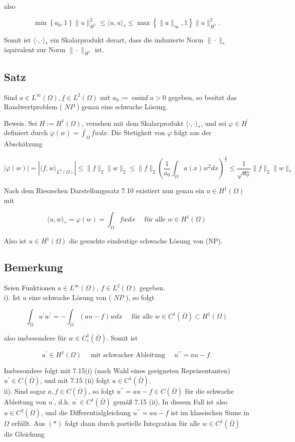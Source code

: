 \documentclass[10pt, letterpaper]{article}
\begin{document}
also

$$
\min \left\{a_{0}, 1\right\}\|u\|_{H^{1}}^{2} \leq\langle u, u\rangle_{*} \leq \max \left\{\|a\|_{\infty}, 1\right\}\|u\|_{H^{1}}^{2} .
$$

Somit ist $\langle\cdot, \cdot\rangle_{*}$ ein Skalarprodukt derart, dass die induzierte Norm $\|\cdot\|_{*}$ äquivalent zur Norm $\|\cdot\|_{H^{1}}$ ist.

\subsection*{Satz}
Sind $a \in L^{\infty}(\Omega), f \in L^{2}(\Omega)$ mit $a_{0}:=\operatorname{essinf} a>0$ gegeben, so besitzt das Randwertproblem ( $N P$ ) genau eine schwache Lösung.

Beweis. Sei $H:=H^{1}(\Omega)$, versehen mit dem Skalarprodukt $\langle\cdot, \cdot\rangle_{*}$, und sei $\varphi \in H^{\prime}$ definiert durch $\varphi(w)=\int_{\Omega} f w d x$. Die Stetigkeit von $\varphi$ folgt aus der Abschätzung

$$
|\varphi(w)|=\left|\langle f, w\rangle_{L^{2}(\Omega)}\right| \leq\|f\|_{2}\|w\|_{2} \leq\|f\|_{2}\left(\frac{1}{a_{0}} \int_{\Omega} a(x) w^{2} d x\right)^{\frac{1}{2}} \leq \frac{1}{\sqrt{a_{0}}}\|f\|_{2}\|w\|_{*}
$$

Nach dem Rieszschen Darstellungssatz 7.10 existiert nun genau ein $u \in H^{1}(\Omega)$ mit

$$
\langle u, w\rangle_{*}=\varphi(w)=\int_{\Omega} f w d x \quad \text { für alle } w \in H^{1}(\Omega)
$$

Also ist $u \in H^{1}(\Omega)$ die gesuchte eindeutige schwache Lösung von (NP).

\subsection*{Bemerkung}
Seien Funktionen $a \in L^{\infty}(\Omega)$, $f \in L^{2}(\Omega)$ gegeben.\\
i). Ist $u$ eine schwache Lösung von ( $N P$ ), so folgt

$$
\int_{\Omega} u^{\prime} w^{\prime}=-\int_{\Omega}(a u-f) w d x \quad \text { für alle } w \in C^{1}(\bar{\Omega}) \subset H^{1}(\Omega)
$$

also insbesondere für $w \in C_{c}^{1}(\bar{\Omega})$. Somit ist

$$
u^{\prime} \in H^{1}(\Omega) \quad \text { mit schwacher Ableitung } \quad u^{\prime \prime}=a u-f .
$$

Insbesondere folgt mit 7.15(i) (nach Wahl eines geeigneten Repräsentanten) $u^{\prime} \in C(\bar{\Omega})$, und mit 7.15 (ii) folgt $u \in C^{1}(\bar{\Omega})$.\\
ii). Sind sogar $a, f \in C(\bar{\Omega})$, so folgt $u^{\prime \prime}=a u-f \in C(\bar{\Omega})$ für die schwache Ableitung von $u^{\prime}$, d.h. $u^{\prime} \in C^{1}(\bar{\Omega})$ gemäß 7.15 (ii). In diesem Fall ist also $u \in C^{2}(\bar{\Omega})$, und die Differentialgleichung $u^{\prime \prime}=a u-f$ ist im klassischen Sinne in $\Omega$ erfüllt. Aus $(*)$ folgt dann durch partielle Integration für alle $w \in C^{1}(\bar{\Omega})$ die Gleichung
\end{document}

